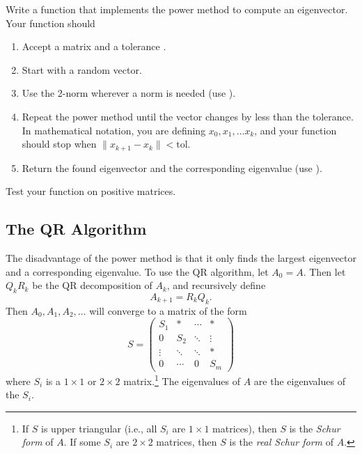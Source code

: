 \begin{problem}
Write a function that implements the power method to compute an eigenvector. Your function should
\begin{enumerate}
\item Accept a matrix and a tolerance .
\item Start with a random vector.
\item Use the 2-norm wherever a norm is needed (use ).
\item Repeat the power method until the vector changes by less than the tolerance. In mathematical notation, you are defining $x_0, x_1, \ldots x_k$, and your function should stop when $\|x_{k+1}-x_k\| < \text{tol}$.
\item Return the found eigenvector and the corresponding eigenvalue (use ).
\end{enumerate} 
Test your function on positive matrices.
\end{problem}

\subsection*{The QR Algorithm}
The disadvantage of the power method is that it only finds the largest eigenvector and a corresponding eigenvalue. 
To use the QR algorithm, let $A_0=A$. Then let $Q_kR_k$ be the QR decomposition of $A_k$, and recursively define 
\[
A_{k+1}=R_kQ_k.
\] 
Then $A_0, A_1, A_2, \ldots $ will converge to a matrix of the form
\begin{equation*}
\label{eq:Schur form}
S =
     \begin{pmatrix}
          S_1 &* & \cdots & * \\
           0     &S_2  &  \ddots & \vdots \\
           \vdots  & \ddots & \ddots & *  \\
           0 & \cdots & 0 & S_m
    \end{pmatrix}
\end{equation*}
where $S_i$ is a $1\times1$ or $2\times2$ matrix.\footnote{If $S$ is upper triangular (i.e., all $S_i$ are $1\times1$ matrices), then $S$ is the \emph{Schur form} of $A$. 
If some $S_i$ are $2\times2$ matrices, then $S$ is the \emph{real Schur form} of $A$.} 
The eigenvalues of $A$ are the eigenvalues of the $S_i$.

